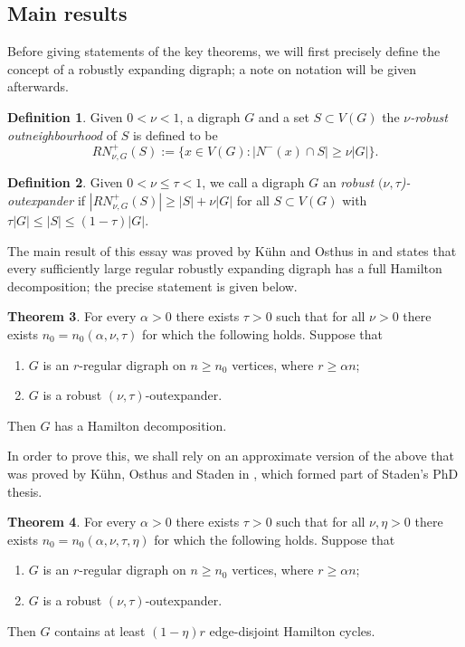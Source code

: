\documentclass[10pt,letterpaper, reqno]{amsart}
\theoremstyle{definition}
\newtheorem{thm}{Theorem}[section]
\newtheorem{defn}[thm]{Definition}
\numberwithin{equation}{section}
\begin{document}
\subsection{Main results}
Before giving statements of the key theorems, we will first precisely define the concept of a robustly expanding digraph; a note on notation will be given afterwards.
\begin{defn}
	Given $0 < \nu  < 1$, a digraph $G$ and a set $S \subset V(G)$ the \textit{$\nu$-robust outneighbourhood} of $S$ is defined to be
	$$ RN^+_{\nu, G}(S) := \{x \in V(G):|N^-(x) \cap S| \geq \nu |G| \}.$$
\end{defn}
\begin{defn}
	Given $0<\nu \leq \tau < 1$, we call a digraph $G$ an \textit{robust $(\nu, \tau$)-outexpander} if $|RN^+_{\nu, G}(S)| \geq |S| + \nu |G|$ for all $S \subset V(G)$ with $\tau |G| \leq |S| \leq (1-\tau)|G|$.
\end{defn}

\noindent The main result of this essay was proved by K\"{u}hn and Osthus in \cite{HamiltonDecomp} and states that every sufficiently large regular robustly expanding digraph has a full Hamilton decomposition; the precise statement is given below.

\begin{thm}\label{Decomp}
	For every $\alpha > 0 $ there exists $\tau >0$ such that for all $\nu > 0 $ there exists $n_0=n_0(\alpha, \nu,\tau)$ for which the following holds. Suppose that
	\begin{enumerate}
		\item $G$ is an $r$-regular digraph on $n\geq n_0$ vertices, where $r \geq \alpha n$;
		\item $G$ is a robust $(\nu, \tau)$-outexpander.
	\end{enumerate}
	Then $G$ has a Hamilton decomposition.
\end{thm}

\noindent In order to prove this, we shall rely on an approximate version of the above that was proved by K\"{u}hn, Osthus and Staden in \cite{ApproxHamiltonDecomp}, which formed part of Staden's PhD thesis.

\begin{thm}\label{ApproxDecomp}
	For every $\alpha > 0 $ there exists $\tau >0$ such that for all $\nu , \eta > 0 $ there exists $n_0=n_0(\alpha, \nu,\tau, \eta)$ for which the following holds. Suppose that
	\begin{enumerate}
		\item $G$ is an $r$-regular digraph on $n\geq n_0$ vertices, where $r \geq \alpha n$;
		\item $G$ is a robust $(\nu, \tau)$-outexpander.
	\end{enumerate}
	Then $G$ contains at least $(1-\eta)r$ edge-disjoint Hamilton cycles. 
\end{thm}
\end{document}

